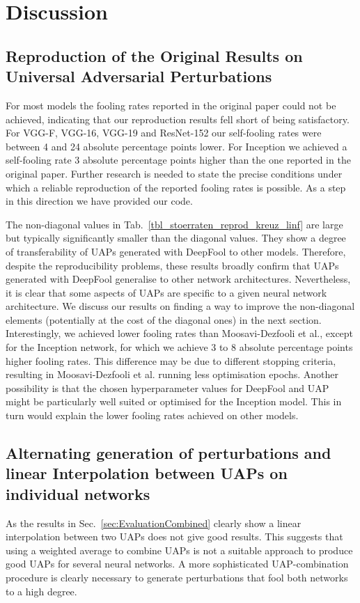 \documentclass[runningheads]{llncs}
\begin{document}
\section{Discussion}\label{sec:Discussion}
\subsection{Reproduction of the Original Results on Universal Adversarial Perturbations}
For most models the fooling rates reported in the original paper could not be achieved, indicating that our reproduction results fell short of being satisfactory. For VGG-F, VGG-16, VGG-19 and ResNet-152 our self-fooling rates were between 4 and 24 absolute percentage points lower. For Inception we achieved a self-fooling rate 3 absolute percentage points higher than the one reported in the original paper. Further research is needed to state the precise conditions under which a reliable reproduction of the reported fooling rates is possible. As a step in this direction we have provided our code.

The non-diagonal values in Tab.~\ref{tbl_stoerraten_reprod_kreuz_linf} are large but typically significantly smaller than the diagonal values. They show a degree of transferability of UAPs generated with DeepFool to other models. Therefore, despite the reproducibility problems, these results broadly confirm that UAPs generated with DeepFool generalise to other network architectures. Nevertheless, it is clear that some aspects of UAPs are specific to a given neural network architecture. We discuss our results on finding a way to improve the non-diagonal elements (potentially at the cost of the diagonal ones) in the next section.
Interestingly, we achieved lower fooling rates than Moosavi-Dezfooli et al., except for the Inception network, for which we achieve 3 to 8 absolute percentage points higher fooling rates. This difference may be due to different stopping criteria, resulting in Moosavi-Dezfooli et al. running less optimisation epochs.
 Another possibility is that the chosen hyperparameter values for DeepFool and UAP might be particularly well suited or optimised for the Inception model. This in turn would explain the lower fooling rates achieved on other models.

\subsection{Alternating generation of perturbations and linear Interpolation be\-tween UAPs on individual networks}
As the results in Sec.~\ref{sec:EvaluationCombined} clearly show a linear interpolation between two UAPs does not give good results. This suggests that using a weighted average to combine UAPs is not a suitable approach to produce good UAPs for several neural networks. A more sophisticated UAP-combination procedure is clearly necessary to generate perturbations that fool both networks to a high degree.
\end{document}
